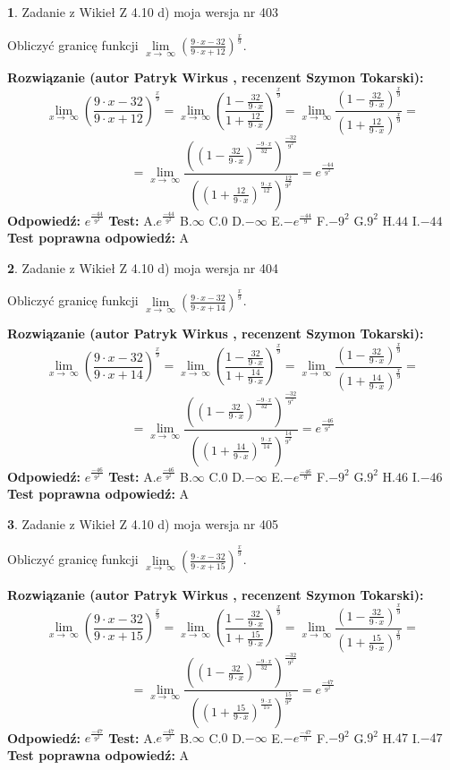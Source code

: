 \documentclass[12pt, a4paper]{article}
\theoremstyle{definition} %
\newtheorem{zad}{}
\newcommand{\zadStart}[1]{\begin{zad}#1\newline}
\newcommand{\zadStop}{\end{zad}}
\newcommand{\rozwStart}[2]{\noindent \textbf{Rozwiązanie (autor #1 , recenzent #2): }\newline}
\newcommand{\rozwStop}{\newline}
\newcommand{\odpStart}{\noindent \textbf{Odpowiedź:}\newline}
\newcommand{\odpStop}{\newline}
\newcommand{\testStart}{\noindent \textbf{Test:}\newline}
\newcommand{\testStop}{\newline}
\newcommand{\kluczStart}{\noindent \textbf{Test poprawna odpowiedź:}\newline}
\newcommand{\kluczStop}{\newline}
\begin{document}
\zadStart{Zadanie z Wikieł Z 4.10 d) moja wersja nr 403}


Obliczyć granicę funkcji  $\lim\limits_{x\to\ \infty}(\frac{9\cdot x-32}{9\cdot x+12})^{\frac{x}{9}}$.
\zadStop
\rozwStart{Patryk Wirkus}{Szymon Tokarski}
$$\lim\limits_{x\to\ \infty}(\frac{9\cdot x-32}{9\cdot x+12})^{\frac{x}{9}} = \lim\limits_{x\to\ \infty}(\frac{1-\frac{32}{9\cdot x}}{1+\frac{12}{9\cdot x}})^{\frac{x}{9}}=\lim\limits_{x\to\ \infty}\frac{(1-\frac{32}{9\cdot x})^{\frac{x}{9}}}{(1+\frac{12}{9\cdot x})^{\frac{x}{9}}}=$$
$$=\lim\limits_{x\to\ \infty}\frac{((1-\frac{32}{9\cdot x})^{\frac{-9\cdot x}{32}})^{\frac{-32}{9^{2}}}}{((1+\frac{12}{9\cdot x})^{\frac{9\cdot x}{12}})^{\frac{12}{9^{2}}}}=e^{\frac{-44}{9^{2}}}$$
\rozwStop
\odpStart
$e^{\frac{-44}{9^{2}}}$
\odpStop
\testStart
A.$e^{\frac{-44}{9^{2}}}$ B.$\infty$ C.$0$ D.$-\infty$ E.$-e^{\frac{-44}{9}}$
F.$-9^{2}$ G.$9^{2}$
H.$44$
I.$-44$
\testStop
\kluczStart
A
\kluczStop



\zadStart{Zadanie z Wikieł Z 4.10 d) moja wersja nr 404}


Obliczyć granicę funkcji  $\lim\limits_{x\to\ \infty}(\frac{9\cdot x-32}{9\cdot x+14})^{\frac{x}{9}}$.
\zadStop
\rozwStart{Patryk Wirkus}{Szymon Tokarski}
$$\lim\limits_{x\to\ \infty}(\frac{9\cdot x-32}{9\cdot x+14})^{\frac{x}{9}} = \lim\limits_{x\to\ \infty}(\frac{1-\frac{32}{9\cdot x}}{1+\frac{14}{9\cdot x}})^{\frac{x}{9}}=\lim\limits_{x\to\ \infty}\frac{(1-\frac{32}{9\cdot x})^{\frac{x}{9}}}{(1+\frac{14}{9\cdot x})^{\frac{x}{9}}}=$$
$$=\lim\limits_{x\to\ \infty}\frac{((1-\frac{32}{9\cdot x})^{\frac{-9\cdot x}{32}})^{\frac{-32}{9^{2}}}}{((1+\frac{14}{9\cdot x})^{\frac{9\cdot x}{14}})^{\frac{14}{9^{2}}}}=e^{\frac{-46}{9^{2}}}$$
\rozwStop
\odpStart
$e^{\frac{-46}{9^{2}}}$
\odpStop
\testStart
A.$e^{\frac{-46}{9^{2}}}$ B.$\infty$ C.$0$ D.$-\infty$ E.$-e^{\frac{-46}{9}}$
F.$-9^{2}$ G.$9^{2}$
H.$46$
I.$-46$
\testStop
\kluczStart
A
\kluczStop



\zadStart{Zadanie z Wikieł Z 4.10 d) moja wersja nr 405}


Obliczyć granicę funkcji  $\lim\limits_{x\to\ \infty}(\frac{9\cdot x-32}{9\cdot x+15})^{\frac{x}{9}}$.
\zadStop
\rozwStart{Patryk Wirkus}{Szymon Tokarski}
$$\lim\limits_{x\to\ \infty}(\frac{9\cdot x-32}{9\cdot x+15})^{\frac{x}{9}} = \lim\limits_{x\to\ \infty}(\frac{1-\frac{32}{9\cdot x}}{1+\frac{15}{9\cdot x}})^{\frac{x}{9}}=\lim\limits_{x\to\ \infty}\frac{(1-\frac{32}{9\cdot x})^{\frac{x}{9}}}{(1+\frac{15}{9\cdot x})^{\frac{x}{9}}}=$$
$$=\lim\limits_{x\to\ \infty}\frac{((1-\frac{32}{9\cdot x})^{\frac{-9\cdot x}{32}})^{\frac{-32}{9^{2}}}}{((1+\frac{15}{9\cdot x})^{\frac{9\cdot x}{15}})^{\frac{15}{9^{2}}}}=e^{\frac{-47}{9^{2}}}$$
\rozwStop
\odpStart
$e^{\frac{-47}{9^{2}}}$
\odpStop
\testStart
A.$e^{\frac{-47}{9^{2}}}$ B.$\infty$ C.$0$ D.$-\infty$ E.$-e^{\frac{-47}{9}}$
F.$-9^{2}$ G.$9^{2}$
H.$47$
I.$-47$
\testStop
\kluczStart
A
\kluczStop
\end{document}

